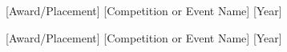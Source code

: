 

\begin{cvhonors}

  \cvhonor
    {[Award/Placement]} %
    {[Competition or Event Name]} %
    {} %
    {[Year]} %

  \cvhonor
    {[Award/Placement]} %
    {[Competition or Event Name]} %
    {} %
    {[Year]} %

\end{cvhonors}
